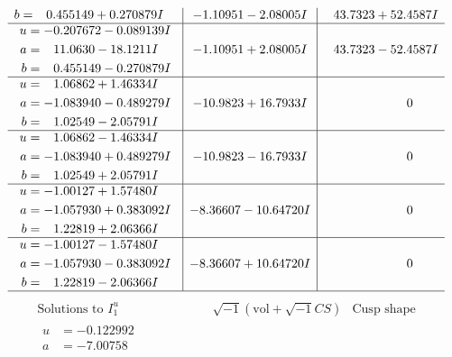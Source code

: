 \documentclass[1p]{elsarticle_modified}
\theoremstyle{definition}
\newcommand{\I}{\sqrt{-1}}
\begin{document}
$$\begin{array}{c|c|c}
\begin{aligned}
b &= \phantom{-}0.455149 + 0.270879 I\end{aligned}
 & -1.10951 - 2.08005 I & \phantom{-}43.7323 + 52.4587 I \\ \hline\begin{aligned}
u &= -0.207672 - 0.089139 I \\
a &= \phantom{-}11.0630 - 18.1211 I \\
b &= \phantom{-}0.455149 - 0.270879 I\end{aligned}
 & -1.10951 + 2.08005 I & \phantom{-}43.7323 - 52.4587 I \\ \hline\begin{aligned}
u &= \phantom{-}1.06862 + 1.46334 I \\
a &= -1.083940 - 0.489279 I \\
b &= \phantom{-}1.02549 - 2.05791 I\end{aligned}
 & -10.9823 + 16.7933 I & \phantom{-0.000000 } 0 \\ \hline\begin{aligned}
u &= \phantom{-}1.06862 - 1.46334 I \\
a &= -1.083940 + 0.489279 I \\
b &= \phantom{-}1.02549 + 2.05791 I\end{aligned}
 & -10.9823 - 16.7933 I & \phantom{-0.000000 } 0 \\ \hline\begin{aligned}
u &= -1.00127 + 1.57480 I \\
a &= -1.057930 + 0.383092 I \\
b &= \phantom{-}1.22819 + 2.06366 I\end{aligned}
 & -8.36607 - 10.64720 I & \phantom{-0.000000 } 0 \\ \hline\begin{aligned}
u &= -1.00127 - 1.57480 I \\
a &= -1.057930 - 0.383092 I \\
b &= \phantom{-}1.22819 - 2.06366 I\end{aligned}
 & -8.36607 + 10.64720 I & \phantom{-0.000000 } 0\\
 \hline 
 \end{array}$$\newpage$$\begin{array}{c|c|c}  
\text{Solutions to }I^u_{1}& \I (\text{vol} + \sqrt{-1}CS) & \text{Cusp shape}\\
 \hline 
\begin{aligned}
u &= -0.122992\phantom{ +0.000000I} \\
a &= -7.00758\phantom{ +0.000000I} \\

\end{aligned}
\end{array}$$
\end{document}
